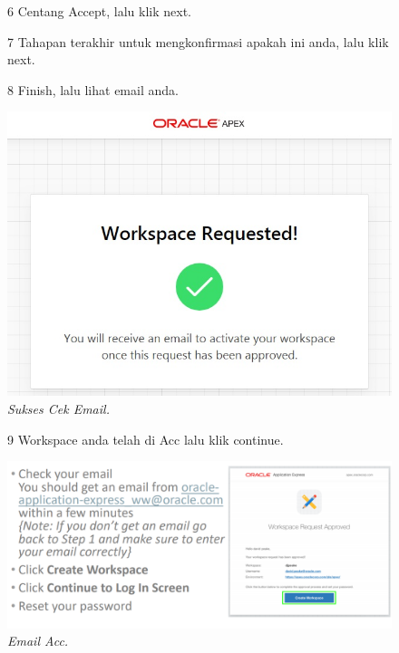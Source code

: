 \begin{enumerate}
\begin{figure}[!htbp]
\item[6] Centang Accept, lalu klik next.

\item[7] Tahapan terakhir untuk mengkonfirmasi apakah ini anda, lalu klik next.

\label{gambar}
\end{figure}

\begin{figure}
\item[8] Finish, lalu lihat email anda.

    \begin{center}
\includegraphics[scale=0.5]{figures/req6.jpg}
    \caption{\textit{Sukses Cek Email.}}
        \end{center}
\label{gambar}
\end{figure}

\begin{figure}
\item[9] Workspace anda telah di Acc lalu klik continue.

    \begin{center}
\includegraphics[scale=0.5]{figures/3.PNG}
    \caption{\textit{Email Acc.}}
        \end{center}
\label{gambar}
\end{figure}


\end{enumerate}
